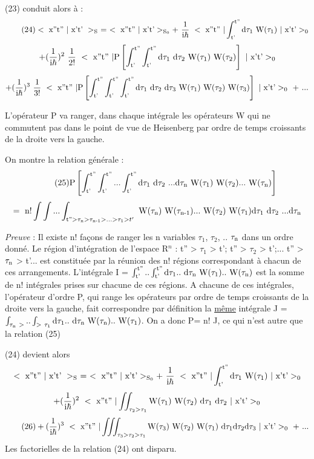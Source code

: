 (23) conduit alors à :
\[
\tag{24} <\text{ x''t'' }|\text{ x't' }>_{\text{S}}\ =\ <\text{ x''t'' }|\text{ x't'}>_{\text{S}_0}
 +\ \frac{1}{\text{i}\hbar}\ <\text{ x''t'' }|\int_{\text{t'}}^{\text{t''}}\text{d}\tau_1\text{ W}(\tau_1)\ |\text{ x't'}>_0
\]
\[
 +(\frac{1}{\mt{i}\hbar})^2\ \frac{1}{2!}\ <\mt{ x''t'' }|\mt{P}\left[\int_\mt{t'}^\mt{t''}\int_\mt{t'}^\mt{t''}\mt{d}\tau_1\ \mt{d}\tau_2\mt{ W}(\tau_1)\mt{ W}(\tau_2)\right]\ |\mt{ x't'}>_0
\]
\[
 +(\frac{1}{\mt{i}\hbar})^3\ \frac{1}{3!}\ <\mt{ x''t'' }|\mt{P}\left[\int_\mt{t'}^\mt{t''}\int_\mt{t'}^\mt{t''}\int_\mt{t'}^\mt{t''}\mt{d}\tau_1\ \mt{d}\tau_2\ \mt{d}\tau_3\mt{ W}(\tau_1)\mt{ W}(\tau_2)\mt{ W}(\tau_3)\right]\ |\mt{ x't'}>_0\ +\ ...
\]

L'opérateur P va ranger, dans chaque intégrale les opérateurs W qui ne commutent pas dans le point de vue de Heisenberg par ordre de temps croissants
de la droite vers la gauche.

On montre la relation générale :
\[
\tag{25}\mt{P}\left[\int_\mt{t'}^\mt{t''}\int_\mt{t'}^\mt{t''}...\int_\mt{t'}^\mt{t''}\mt{d}\tau_1\ \mt{d}\tau_2\ ...\mt{d}\tau_\mt{n}\mt{ W}(\tau_1)\mt{ W}(\tau_2)...\mt{ W}(\tau_\mt{n})\right]
\]
\[
=\text{ n!}\int\int ... \int_{\text{t''}>\tau_{\text{n}}>\tau_{\text{n-1}}>...>\tau_1> t'}\text{ W}(\tau_{\text{n}})\text{ W}(\tau_{\text{n-1}})...\text{ W}(\tau_2)\text{ W}(\tau_1)\text{d}\tau_1\ \text{d}\tau_2\ ...\text{d}\tau_{\text{n}}
\]

{\it Preuve} : Il existe n! façons de ranger les n variables $\tau_1$, $\tau_2$, .. $\tau_{\text{n}}$ dans un ordre
donné. Le région d'intégration de l'espace R$^n$ : t'' > $\tau_1$ > t'; t'' > $\tau_2$ > t';...  t'' > $\tau_{\text{n}}$ > t'...
est constituée par la réunion des n! régions correspondant à
chacun de ces arrangements. L'intégrale I = $\int_\mt{t'}^\mt{t''}..\int_\mt{t'}^\mt{t''}\mt{d}\tau_1..\ \mt{d}\tau_\mt{n}\mt{ W}(\tau_1)..\mt{ W}(\tau_\mt{n})$
est la somme de n! intégrales prises sur chacune de ces régions. A chacune de
ces intégrales, l'opérateur d'ordre P, qui range les opérateurs par ordre de
temps croissants de la droite vers la gauche, fait correspondre par définition
la \ul{même} intégrale J = $\int_{\tau_\mt{n}\ >}..\int_{>\ \tau_\mt{1}}\mt{d}\tau_1..\ \mt{d}\tau_\mt{n}\mt{ W}(\tau_\mt{n})..\mt{ W}(\tau_1)$.
On a donc P\big[\;I\;\big] = n! J,  ce qui n'est autre que la relation (25)

(24) devient alors
\[
 <\text{ x''t'' }|\text{ x't' }>_{\text{S}}\ =\ <\text{ x''t'' }|\text{ x't'}>_{\text{S}_0}
 +\ \frac{1}{\text{i}\hbar}\ <\text{ x''t'' }|\int_{\text{t'}}^{\text{t''}}\text{d}\tau_1\text{ W}(\tau_1)\ |\text{ x't'}>_0
\]
\[
 +(\frac{1}{\mt{i}\hbar})^2\ <\mt{ x''t'' }|\iint_{\tau_2>\tau_1}\mt{W}(\tau_1)\mt{ W}(\tau_2)\ \mt{d}\tau_1\ \mt{d}\tau_2\ |\mt{ x't'}>_0
\]
\[
\tag{26} +(\frac{1}{\text{i}\hbar})^3\ <\text{ x''t'' }|\iiint_{\tau_3>\tau_2>\tau_1}\text{W}(\tau_3)\text{ W}(\tau_2)\text{ W}(\tau_1)\ \text{d}\tau_1\text{d}\tau_2\text{d}\tau_3\ |\text{ x't'}>_0\ +\ ...
\]
Les factorielles de la relation (24) ont disparu.

